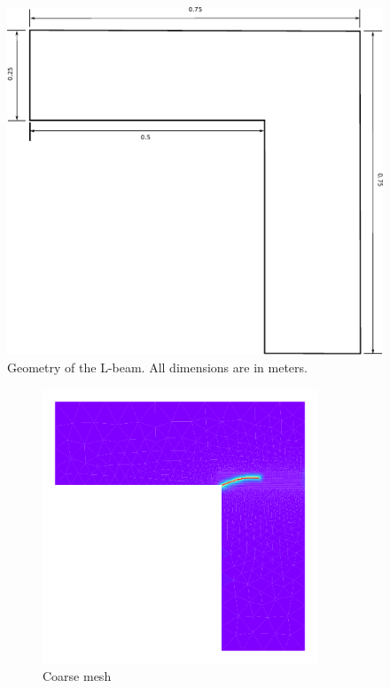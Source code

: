 \documentclass[10pt]{elsarticle}
\begin{document}
\begin{figure}
	\centering
	\includegraphics[width=0.4\linewidth]{./Images/L/L_beam.pdf}
	\caption{Geometry of the L-beam. All dimensions are in meters.}
	\label{L_beam_dims}
\end{figure}

\begin{figure}[ht]
	\begin{subfigure}{0.32\textwidth}
		\centering
		\includegraphics[width=0.9\textwidth]{./Images/L/damage_coar.pdf}
		\caption{Coarse mesh}
	\end{subfigure}
	\hfill
	\begin{subfigure}{0.32\textwidth}
		\centering

\end{subfigure}
\end{figure}
\end{document}
